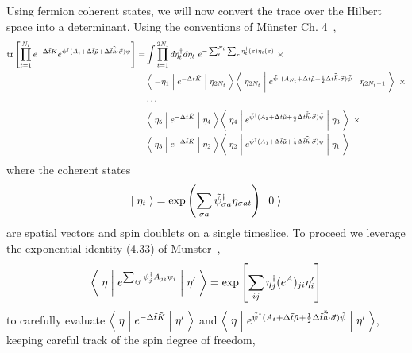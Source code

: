 Using fermion coherent states, we will now convert the trace over the Hilbert space into a determinant.
Using the conventions of M\"{u}nster Ch. 4~\cite{munster},
\begin{align}
	\text{tr}\left[\prod_{t=1}^{N_t} e^{-\Delta \tilde{t}\tilde{K}}  e^{ \tilde{\psi}{}^{\dagger} (A_t + \Delta\tilde{t} \tilde{\mu} + \Delta\tilde{t}\tilde{\vec{h}}\cdot\vec{\sigma}) \tilde{\psi} }\right]
	=& \int \prod_{t=1}^{2N_t} d \eta^{\dagger}_t d\eta_t ~ e^{- \sum_{t}^{N_t}\sum_x \eta^{\dagger}_t(x) \eta_t(x)}~ \times
	\nonumber\\
	&
		\left\langle\; -\eta_1 \;\middle|\; e^{-\Delta \tilde{t}\tilde{K} }\;\middle|\;\eta_{2 N_t}\;\right\rangle
		\left\langle\; \eta_{2 N_t} \;\middle|\; e^{ \tilde{\psi}{}^{\dagger} (A_{N_t} + \Delta\tilde{t}\tilde{\mu} + \frac{1}{2} \Delta\tilde{t}\tilde{\vec{h}}\cdot\vec{\sigma})\tilde{\psi} } \;\middle|\;\eta_{2 N_t-1}\;\right\rangle ~ \times
	\nonumber\\
	&
		\cdots
	\nonumber\\
	&
		\left\langle\; \eta_5 \;\middle|\; e^{-\Delta \tilde{t}\tilde{K} }\;\middle|\;\eta_{4}\;\right\rangle
		\left\langle\; \eta_4 \;\middle|\; e^{ \tilde{\psi}{}^{\dagger} (A_{2} + \Delta\tilde{t}\tilde{\mu} + \frac{1}{2} \Delta\tilde{t}\tilde{\vec{h}}\cdot\vec{\sigma}) \tilde{\psi}} \;\middle|\;\eta_3\;\right\rangle ~ \times
	\nonumber\\
	&
		\left\langle\; \eta_3 \;\middle|\; e^{-\Delta \tilde{t}\tilde{K} }\;\middle|\;\eta_{2}\;\right\rangle
		\left\langle\; \eta_2 \;\middle|\; e^{ \tilde{\psi}{}^{\dagger} (A_{1} + \Delta\tilde{t}\tilde{\mu} + \frac{1}{2} \Delta\tilde{t}\tilde{\vec{h}}\cdot\vec{\sigma}) \tilde{\psi}} \;\middle|\;\eta_1\;\right\rangle
	\label{eq:coherent state trace}
\end{align}
where the coherent states
\begin{equation*}
	\left|\;\eta_t\;\right\rangle = \exp\left( \sum_{\sigma a} \tilde{\psi}^{\dagger}_{\sigma a} \eta_{\sigma a t} \right) \left|\;0\;\right\rangle
\end{equation*}
are spatial vectors and spin doublets on a single timeslice.
To proceed we leverage the exponential identity (4.33) of Munster~\cite{munster},
\begin{equation}
	\left\langle\; \eta \;\middle|\; e^{\sum_{ij} \psi^{\dagger}_j A_{ji} \psi_i} \;\middle|\; \eta' \;\right\rangle
	=
	\exp\left[ \sum_{i j} \eta^{\dagger}_j (e^A)_{ji} \eta'_i \right]
\end{equation}
to carefully evaluate $\left\langle\;\eta\;\middle|\; e^{-\Delta \tilde{t}\tilde{K}} \;\middle|\;\eta'\;\right\rangle$ and $\left\langle\;\eta\;\middle|\; e^{\tilde{\psi}{}^{\dagger}(A_t + \Delta \tilde{t} \tilde{\mu} + \frac{1}{2} \Delta\tilde{t}\tilde{\vec{h}}\cdot\vec{\sigma})\tilde{\psi}} \;\middle|\;\eta'\;\right\rangle$, keeping careful track of the spin degree of freedom,
